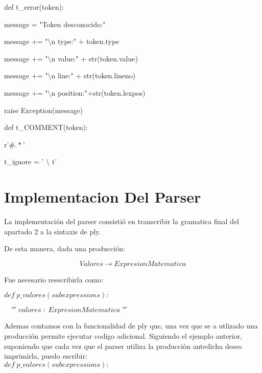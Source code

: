 \begin{multicols}{2}

def t\_error(token):

 \hspace{2mm}message = "Token desconocido:"
    
\hspace{2mm}message += "$\setminus$n type:" + token.type
    
\hspace{2mm}message += "$\setminus$n value:" + str(token.value)
    
\hspace{2mm}message += "$\setminus$n line:" + str(token.lineno)
    
\hspace{2mm}message += "$\setminus$n position:"+str(token.lexpos)
    
\hspace{2mm}raise Exception(message)
  

\columnbreak

def t\_COMMENT(token):

\hspace{2mm}    r'$\#.*$'

t\_ignore  = ' $\setminus$ t'

\end{multicols}

\section{Implementacion Del Parser}

La implementación del parser consistió en transcribir la gramatica final del apartado $2$ a la sintaxis de ply.

De esta manera, dada una producción:

$$Valores \rightarrow ExpresionMatematica$$

Fue necesario reescribirla como:


$def\; p\_valores(subexpressions):$

$\quad'''\; valores\; :\; ExpresionMatematica\;'''$


Ademas contamos con la funcionalidad de ply que, una vez que se a utlizado una producción permite ejecutar codigo adicional. Siguiendo el ejemplo anterior, suponiendo que cada vez que el parser utiliza la producciòn antedicha deseo imprimirla, puedo escribir:
\\

$def\; p\_valores(subexpressions):$

